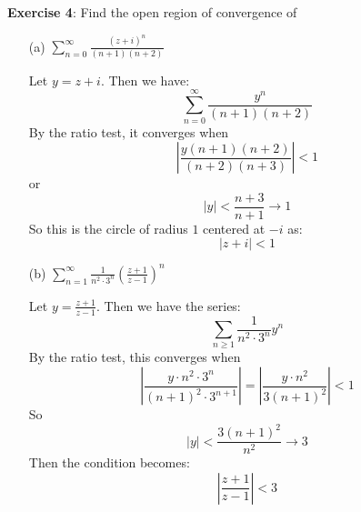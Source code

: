 \documentclass{article}
\begin{document}
\textbf{Exercise 4}: Find the open region of convergence of 
    \begin{itemize}
        \item [(a)] $\sum_{n = 0}^{\infty} \frac{(z + i)^{n}}{(n + 1)(n + 2)}$
            \begin{answer}
                Let $y = z + i$. Then we have:
                    \begin{equation*}
                        \sum_{n = 0}^{\infty} \dfrac{y^{n}}{(n + 1)(n + 2)}
                    \end{equation*}
                By the ratio test, it converges when
                    \begin{equation*}
                        \left\lvert \dfrac{y(n + 1)(n + 2)}{(n + 2)(n + 3)} \right\rvert < 1
                    \end{equation*}
                or 
                    \begin{equation*}
                        \left\lvert y \right\rvert < \dfrac{n + 3}{n + 1} \rightarrow 1
                    \end{equation*}
                So this is the circle of radius $1$ centered at $-i$ as:
                    \begin{equation*}
                        \lvert z + i \rvert < 1
                    \end{equation*}
            \end{answer}

        \item [(b)] $\sum_{n = 1}^{\infty} \frac{1}{n^{2} \cdot 3^{n}} \left(\frac{z + 1}{z - 1}\right)^{n}$ 
            \begin{answer}
                Let $y = \frac{z + 1}{z - 1}$. Then we have the series:
                    \begin{equation*}
                        \sum_{n \geq 1} \dfrac{1}{n^{2} \cdot 3^{n}}y^{n}
                    \end{equation*}
                By the ratio test, this converges when
                    \begin{equation*}
                        \left\lvert \dfrac{y \cdot n^{2} \cdot 3^{n}}{(n + 1)^{2} \cdot 3^{n + 1}} \right\rvert = \left\lvert \dfrac{y \cdot n^{2}}{3 (n + 1)^{2}} \right\rvert < 1
                    \end{equation*}
                So 
                    \begin{equation*}
                        \lvert y \rvert < \dfrac{3(n + 1)^{2}}{n^{2}} \rightarrow 3
                    \end{equation*}
                Then the condition becomes:
                    \begin{equation*}
                        \left\lvert \dfrac{z + 1}{z - 1} \right\rvert < 3
                    \end{equation*}
            \end{answer}
    \end{itemize}
\end{document}

